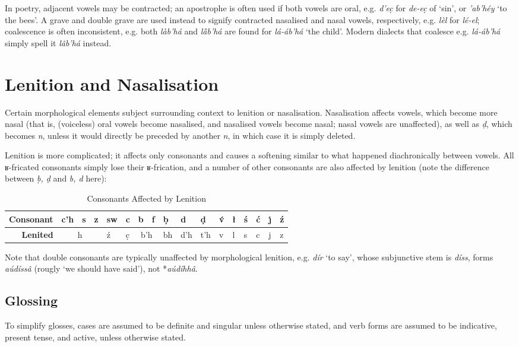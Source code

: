 \documentclass[a4paper, 12pt, twoside, openright, final]{book}
\let \nf \normalfont
\let \w \textit
\begin{document}
In poetry, adjacent vowels may be contracted; an apostrophe is often used if both vowels are oral, e.g. \w{d’ec̣} for
\w{de-ec̣}  of ‘sin’, or \w{’ab’héy} ‘to the bees’. A grave and double grave are used instead to signify contracted
nasalised and nasal vowels, respectively, e.g. \w{lèl} for \w{lé-el}; coalescence is often inconsistent, e.g. both \w{làb’há}
and \w{lȁb’há} are found for \w{lá-áb’há} ‘the child’. Modern dialects that coalesce e.g. \w{lá-áb’há} simply spell it
\w{lâb’há} instead.

\section{Lenition and Nasalisation}
Certain morphological elements subject surrounding context to lenition or nasalisation. Nasalisation affects vowels,
which become more nasal (that is, (voiceless) oral vowels become nasalised, and nasalised vowels become nasal; nasal
vowels are unaffected), as well as \w{ḍ}, which becomes \w{n}, unless it would directly be preceded by another \w{n}, in
which case it is simply deleted.

Lenition is more complicated; it affects only consonants and causes a softening similar to what happened diachronically
between vowels. All ʁ-fricated consonants simply lose their ʁ-frication, and a number of other consonants are also
affected by lenition (note the difference between \w{ḅ, ḍ} and \w{b, d} here):

\begin{table}[H]
\centering
\itshape
\begin{tabular}{r|lll|l|l|ll|l|l|l|l|l|l|l|l|l}
\bf Consonant & c’h & s & z & sw     & c & b & f                        & ḅ   & d   & ḍ   & v́ & ł & ś & ć & ȷ́ & ź  \\\hline
\bf Lenited & \multicolumn{3}{c|}{h} & ź & c̣ & \multicolumn{2}{c|}{b’h} & bh  & d’h & t’h & v & l & s & c & j & z \\
\end{tabular}
\nf
\caption{Consonants Affected by Lenition}\label{tab:lenition}
\end{table}

\noindent Note that double consonants are typically unaffected by morphological lenition, e.g. \w{dír} ‘to say’,
whose subjunctive stem is \w{díss}, forms \w{aúdíssâ} (rougly ‘we should have said’), not *\w{aúdíhhâ}.

\subsection{Glossing}
To simplify glosses, cases are assumed to be definite and singular unless otherwise stated, and verb forms are
assumed to be indicative, present tense, and active, unless otherwise stated.
\end{document}
